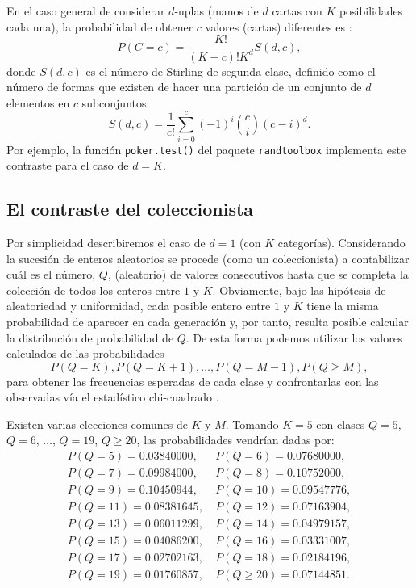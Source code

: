 \documentclass[
  10pt,
]{book}
\theoremstyle{break}
\theoremstyle{nonumberplain}
\begin{document}
En el caso general de considerar \(d\)-uplas (manos de \(d\) cartas con \(K\) posibilidades cada una), la probabilidad de obtener \(c\) valores (cartas) diferentes es \citep[e.g.][Sección 3.3.2, p.~64]{knuth2002}:
\[P(C=c) = \frac{K!}{(K-c)!K^d}S(d,c),\]
donde \(S(d,c)\) es el número de Stirling de segunda clase, definido como el número de formas que existen de hacer una partición de un conjunto de \(d\) elementos en \(c\) subconjuntos:
\[S(d,c) = \frac{1}{c!}\sum_{i=0}^{c} (-1)^{i} \binom{c}{i} (c-i)^d.\]
Por ejemplo, la función \texttt{poker.test()} del paquete \texttt{randtoolbox} implementa este contraste para el caso de \(d=K\).

\hypertarget{el-contraste-del-coleccionista}{%
\subsection{El contraste del coleccionista}\label{el-contraste-del-coleccionista}}

Por simplicidad describiremos el caso de \(d=1\) (con \(K\) categorías).
Considerando la sucesión de enteros aleatorios se procede (como un
coleccionista) a contabilizar cuál es el número, \(Q\), (aleatorio) de
valores consecutivos hasta que se completa la colección de todos los
enteros entre \(1\) y \(K\). Obviamente, bajo las hipótesis de aleatoriedad
y uniformidad, cada posible entero entre \(1\) y
\(K\) tiene la misma probabilidad de aparecer en cada generación y, por
tanto, resulta posible calcular la distribución de probabilidad de \(Q\).
De esta forma podemos utilizar los valores calculados de las probabilidades
\[P( Q = K ), P( Q = K+1 ),\ldots, P( Q = M -1 ), P( Q \geq M ),\]
para obtener las frecuencias esperadas de cada clase y confrontarlas con las
observadas vía el estadístico chi-cuadrado \citep[e.g.][Sección 3.3.2, p.~65]{knuth2002}.

Existen varias elecciones comunes de \(K\) y \(M\).
Tomando \(K=5\) con clases \(Q=5\), \(Q=6\), \(\ldots\), \(Q=19\), \(Q\geq20\), las probabilidades vendrían dadas por:
\[\begin{array}{rr}
P( Q = 5 ) = 0.03840000, \ & P( Q = 6 ) = 0.07680000,\\
P( Q = 7 ) = 0.09984000, \ & P( Q = 8 ) = 0.10752000,\\
P( Q = 9 ) = 0.10450944, \ & P( Q = 10 ) = 0.09547776,\\
P( Q = 11 ) = 0.08381645, \ & P( Q = 12 ) = 0.07163904,\\
P( Q = 13 ) = 0.06011299, \ & P( Q = 14 ) = 0.04979157,\\
P( Q = 15 ) = 0.04086200, \ & P( Q = 16 ) = 0.03331007,\\
P( Q = 17 ) = 0.02702163, \ & P( Q = 18 ) = 0.02184196,\\
P( Q = 19 ) = 0.01760857, \ & P( Q\geq20 ) = 0.07144851.
\end{array}\]
\end{document}
